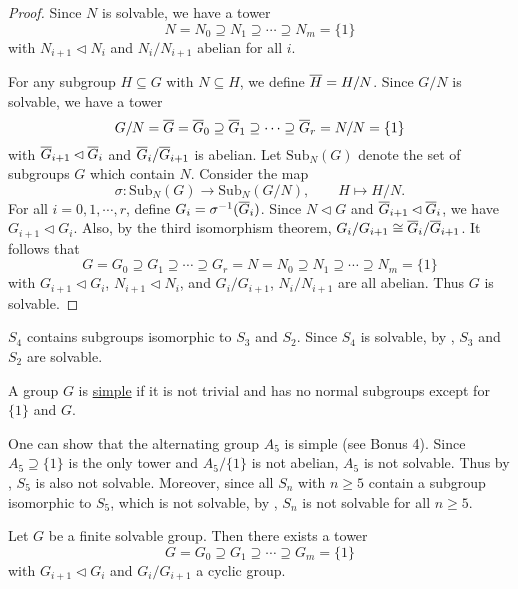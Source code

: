 \documentclass[11pt]{article}
\begin{document}
\begin{proof}
    Since $N$ is solvable, we have a tower
    \[N=N_0\supseteq N_1\supseteq\cdots\supseteq N_m=\{1\}\]
    with $N_{i+1}\lhd N_i$ and $N_i/N_{i+1}$ abelian for all $i$.

    For any subgroup $H\subseteq G$ with $N\subseteq H$, we define $\overline{H}=H/N$. Since $G/N$ is solvable, we have a tower
    \[G/N=\overline{G}=\overline{G}_0\supseteq\overline{G}_1\supseteq\cdots\supseteq\overline{G}_r=N/N=\{1\}\]
    with $\overline{G}_{i+1}\lhd\overline{G}_i$ and $\overline{G}_i/\overline{G}_{i+1}$ is abelian. Let $\text{Sub}_N(G)$ denote the set of subgroups $G$ which contain $N$. Consider the map
    \[\sigma:\text{Sub}_N(G)\to\text{Sub}_N(G/N),\qquad H\mapsto H/N.\]
    For all $i=0,1,\cdots,r$, define $G_i=\sigma^{-1}(\overline{G}_i)$. Since $N\lhd G$ and $\overline{G}_{i+1}\lhd\overline{G}_i$, we have $G_{i+1}\lhd G_i$. Also, by the third isomorphism theorem, $G_i/G_{i+1}\cong\overline{G}_i/\overline{G}_{i+1}$. It follows that
    \[G=G_0\supseteq G_1\supseteq\cdots\supseteq G_r=N=N_0\supseteq N_1\supseteq\cdots\supseteq N_m=\{1\}\]
    with $G_{i+1}\lhd G_i$, $N_{i+1}\lhd N_i$, and $G_i/G_{i+1}$, $N_i/N_{i+1}$ are all abelian. Thus $G$ is solvable.
    
\end{proof}

\begin{example}
    $S_4$ contains subgroups isomorphic to $S_3$ and $S_2$. Since $S_4$ is solvable, by , $S_3$ and $S_2$ are solvable.
\end{example}

\begin{definition}
    A group $G$ is \ul{simple} if it is not trivial and has no normal subgroups except for $\{1\}$ and $G$.
\end{definition}

\begin{example}
    One can show that the alternating group $A_5$ is simple (see Bonus 4). Since $A_5\supseteq\{1\}$ is the only tower and $A_5/\{1\}$ is not abelian, $A_5$ is not solvable. Thus by , $S_5$ is also not solvable. Moreover, since all $S_n$ with $n\geq 5$ contain a subgroup isomorphic to $S_5$, which is not solvable, by , $S_n$ is not solvable for all $n\geq 5$.
\end{example}

\begin{corollary}
    Let $G$ be a finite solvable group. Then there exists a tower
    \[G=G_0\supseteq G_1\supseteq\cdots\supseteq G_m=\{1\}\]
    with $G_{i+1}\lhd G_i$ and $G_i/G_{i+1}$ a cyclic group.
\end{corollary}
\end{document}
